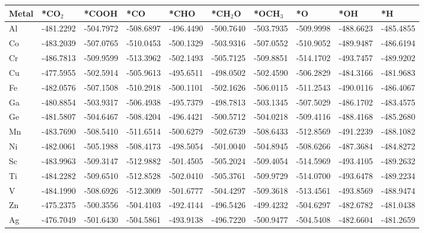 \begin{table}[h]
  \centering
  {\fontsize{6}{12}\selectfont
  \begin{tabular}{*{10}{l}}
    \hline
    Metal & *CO$_2$ & *COOH    & *CO       & *CHO      & *CH$_2$O  & *OCH$_3$  & *O        & *OH       & *H        \\
    \hline
    Al & -481.2292 & -504.7972 & -508.6897 & -496.4490 & -500.7640 & -503.7935 & -509.9998 & -488.6623 & -485.4855 \\
    Co & -483.2039 & -507.0765 & -510.0453 & -500.1329 & -503.9316 & -507.0552 & -510.9052 & -489.9487 & -486.6194 \\
    Cr & -486.7813 & -509.9599 & -513.3962 & -502.1493 & -505.7125 & -509.8851 & -514.1702 & -493.7457 & -489.9202 \\
    Cu & -477.5955 & -502.5914 & -505.9613 & -495.6511 & -498.0502 & -502.4590 & -506.2829 & -484.3166 & -481.9683 \\
    Fe & -482.0576 & -507.1508 & -510.2918 & -500.1101 & -502.1626 & -506.0115 & -511.2543 & -490.0116 & -486.4067 \\
    Ga & -480.8854 & -503.9317 & -506.4938 & -495.7379 & -498.7813 & -503.1345 & -507.5029 & -486.1702 & -483.4575 \\
    Ge & -481.5807 & -504.6467 & -508.4204 & -496.4421 & -500.5712 & -504.0218 & -509.4116 & -488.4168 & -485.2680 \\
    Mn & -483.7690 & -508.5410 & -511.6514 & -500.6279 & -502.6739 & -508.6433 & -512.8569 & -491.2239 & -488.1082 \\
    Ni & -482.0061 & -505.1988 & -508.4173 & -498.5054 & -501.0040 & -504.8945 & -508.6266 & -487.3684 & -484.8272 \\
    Sc & -483.9963 & -509.3147 & -512.9882 & -501.4505 & -505.2024 & -509.4054 & -514.5969 & -493.4105 & -489.2632 \\
    Ti & -484.2282 & -509.6510 & -512.8528 & -502.0410 & -505.3761 & -509.9729 & -514.0700 & -493.6478 & -489.2234 \\
    V  & -484.1990 & -508.6926 & -512.3009 & -501.6777 & -504.4297 & -509.3618 & -513.4561 & -493.8569 & -488.9474 \\
    Zn & -475.2375 & -500.3556 & -504.4103 & -492.4144 & -496.5426 & -499.4232 & -504.6297 & -482.6782 & -481.0438 \\
    Ag & -476.7049 & -501.6430 & -504.5861 & -493.9138 & -496.7220 & -500.9477 & -504.5408 & -482.6604 & -481.2659 \\

\end{tabular}}
\end{table}
